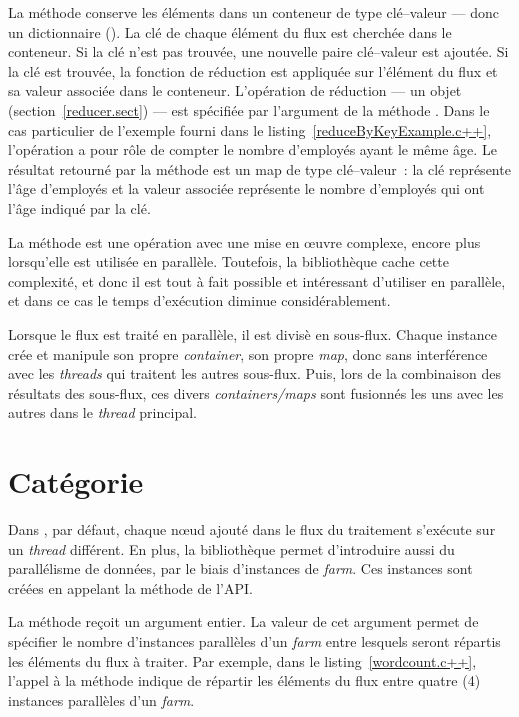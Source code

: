 La m\'ethode  conserve les \'el\'ements dans un conteneur de type cl\'e--valeur --- donc un dictionnaire (). La cl\'e de chaque \'el\'ement du flux est cherch\'ee dans le conteneur. Si la cl\'e n'est pas trouv\'ee, une nouvelle paire cl\'e--valeur est ajout\'ee. Si la cl\'e est trouv\'ee, la fonction de r\'eduction est appliqu\'ee sur l'\'el\'ement du flux et sa valeur associ\'ee dans le conteneur. L'op\'eration de r\'eduction --- un objet  (section~\ref{reducer.sect})  --- est sp\'ecifi\'ee par l'argument de la m\'ethode . Dans le cas particulier de l'exemple fourni dans le listing~\ref{reduceByKeyExample.c++}, l'op\'eration a pour r\^ole de compter le nombre d'employ\'es ayant le m\^eme \^age. Le r\'esultat retourn\'e par la m\'ethode  est un map de type cl\'e--valeur~: la cl\'e repr\'esente l'\^age d'employ\'es et la valeur associ\'ee repr\'esente le nombre d'employ\'es qui ont l'\^age indiqu\'e par la cl\'e.

La m\'ethode  est une op\'eration avec une mise en \oe{}uvre complexe, encore plus lorsqu'elle est utilis\'ee en parall\`ele. Toutefois, la biblioth\`eque  cache cette complexit\'e, et donc il est tout à fait possible et intéressant d'utiliser  en parall\`ele, et dans ce cas le temps d'ex\'ecution diminue consid\'erablement.


Lorsque le flux est trait\'e en parall\`ele, il est divis\`e en sous-flux. Chaque instance cr\'ee et manipule son propre \emph{container}, son propre \emph{map}, donc sans interf\'erence avec les \emph{threads} qui traitent les autres sous-flux. Puis, lors de la combinaison des r\'esultats des sous-flux, ces divers \emph{containers/maps} sont fusionn\'es les uns avec les autres dans le \emph{thread} principal.


\section{Cat\'egorie }

\label{execution.sect}


Dans , par d\'efaut, chaque nœud ajout\'e dans le flux du traitement s'ex\'ecute sur un \emph{thread} diff\'erent. En plus, la biblioth\`eque  permet d'introduire aussi du parall\'elisme de données, par le biais d'instances de \emph{farm}. Ces instances sont cr\'e\'ees en appelant la m\'ethode  de l’API.  

La méthode  reçoit un argument entier.
%
La valeur de cet argument permet de sp\'ecifier le nombre d'instances parall\`eles d'un \emph{farm} entre lesquels seront r\'epartis les \'el\'ements du flux \`a traiter. Par exemple, dans le listing~\ref{wordcount.c++}, l'appel \`a la m\'ethode  indique de r\'epartir les \'el\'ements du flux entre quatre (4) instances parall\`eles d'un \emph{farm}.


